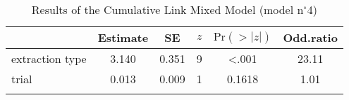 \begin{table}
\begin{tabular}{l S[table-format=1.3] S[table-format=1.3] S[table-format=1] S[table-format=<1.4] S[table-format=2.2]}
  \lsptoprule
 & {Estimate} & {SE} & {$z$} & {$\text{Pr}(>|z|)$} & {Odd.ratio} \\ 
  \midrule
  extraction type & 3.140 & 0.351 & 9 & <.001 & 23.11 \\ 
  trial & 0.013 & 0.009 & 1 & 0.1618 & 1.01 \\ 
   \lspbottomrule
\end{tabular}
\caption{Results of the Cumulative Link Mixed Model (model n$^{\circ}$4)}
\label{tab:exp08-m3}
\end{table}
